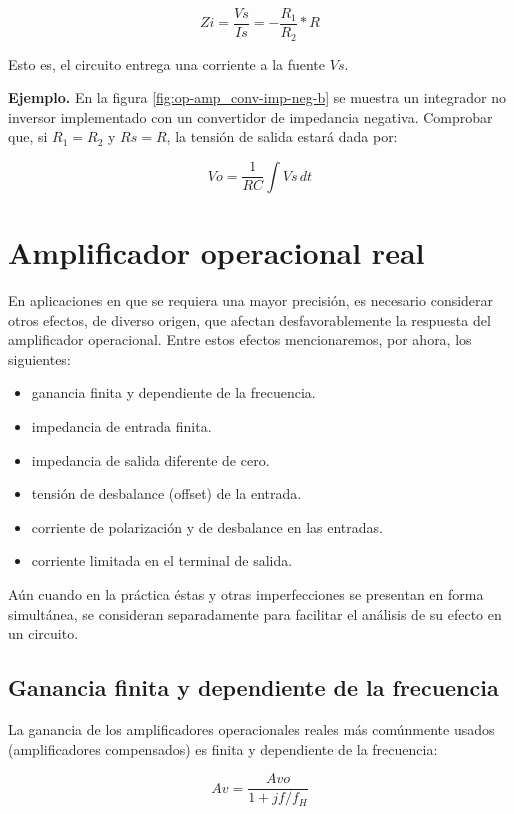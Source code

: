 \begin{equation}
	Zi = \frac{Vs}{Is} = - \frac{R_1}{R_2} * R
\end{equation}

Esto es, el circuito entrega una corriente a la fuente $Vs$.

\textbf{Ejemplo.} En la figura \ref{fig:op-amp_conv-imp-neg-b} se muestra un integrador no inversor implementado con un convertidor de impedancia negativa. Comprobar que, si $R_1 = R_2$ y $Rs = R$, la tensión de salida estará dada por:

\begin{equation}
	Vo = \frac{1}{RC} \int Vs \, dt
\end{equation}

\section{Amplificador operacional real}
En aplicaciones en que se requiera una mayor precisión, es necesario considerar otros efectos, de diverso origen, que afectan desfavorablemente la respuesta del amplificador operacional. Entre estos efectos mencionaremos, por ahora, los siguientes:

\begin{itemize}
	\item ganancia finita y dependiente de la frecuencia.
	\item impedancia de entrada finita.
	\item impedancia de salida diferente de cero.
	\item tensión de desbalance (offset) de la entrada.
	\item corriente de polarización y de desbalance en las entradas.
	\item corriente limitada en el terminal de salida.
\end{itemize}

Aún cuando en la práctica éstas y otras imperfecciones se presentan en forma simultánea, se consideran separadamente para facilitar el análisis de su efecto en un circuito.

\subsection{Ganancia finita y dependiente de la frecuencia}
La ganancia de los amplificadores operacionales reales más comúnmente usados (amplificadores compensados) es finita y dependiente de la frecuencia:

\begin{equation}
	Av = \frac{Avo}{1 + jf/f_H}
\end{equation}

